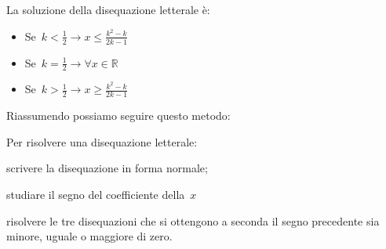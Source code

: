 La soluzione della disequazione letterale è:

\begin{multicols}{3}
\begin{itemize} [noitemsep]
 \item Se~$k < \frac{1}{2} \rightarrow x \le \frac{k^2 - k}{2 k - 1}$
 \item Se~$k = \frac{1}{2} \rightarrow \forall x \in \mathbb{R}$
 \item Se~$k > \frac{1}{2} \rightarrow x \ge \frac{k^2 - k}{2 k - 1}$
\end{itemize}
\end{multicols}

Riassumendo possiamo seguire questo metodo:

\begin{procedura}
 Per risolvere una disequazione letterale:
\begin{enumeratea}
 \item scrivere la disequazione in forma normale;
 \item studiare il segno del coefficiente della~$x$
 \item risolvere le tre disequazioni che si ottengono a seconda il segno
  precedente sia minore, uguale o maggiore di zero.
\end{enumeratea}
\end{procedura}






